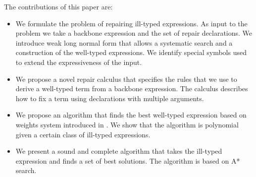 The contributions of this paper are:
\begin{itemize}
	\item We formulate the problem of repairing ill-typed expressions.
	As input to the problem we take a backbone expression and 
	the set of repair declarations. We introduce weak long normal 
	form that allows a systematic search and a construction of the well-typed expressions.
	We identify special symbols used to extend the expressiveness of the input.
	\item We propose a novel repair calculus that specifies the rules that
	we use to derive a well-typed term from a backbone expression.
	The calculus describes how to fix a term using declarations with multiple arguments.
	\item We propose an algorithm that finds the best well-typed expression based on 
	weights system introduced in \cite{GveroETAL13CompleteCompletionTypesWeights}.
    We show that the algorithm is polynomial given a certain class of ill-typed expressions.
    \item We present a sound and complete algorithm that takes the ill-typed expression and 
    finds a set of best solutions. The algorithm is based on A* search.
\end{itemize}